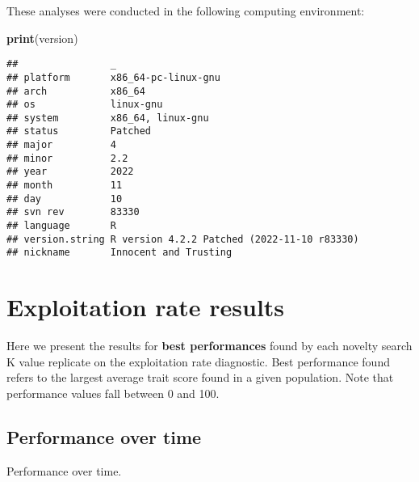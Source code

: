 \documentclass[]{book}
\newenvironment{Shaded}{\begin{snugshade}}{\end{snugshade}}
\newcommand{\KeywordTok}[1]{\textcolor[rgb]{0.13,0.29,0.53}{\textbf{#1}}}
\newcommand{\NormalTok}[1]{#1}
\begin{document}
These analyses were conducted in the following computing environment:

\begin{Shaded}
\begin{Highlighting}[]
\KeywordTok{print}\NormalTok{(version)}
\end{Highlighting}
\end{Shaded}

\begin{verbatim}
##                _                                          
## platform       x86_64-pc-linux-gnu                        
## arch           x86_64                                     
## os             linux-gnu                                  
## system         x86_64, linux-gnu                          
## status         Patched                                    
## major          4                                          
## minor          2.2                                        
## year           2022                                       
## month          11                                         
## day            10                                         
## svn rev        83330                                      
## language       R                                          
## version.string R version 4.2.2 Patched (2022-11-10 r83330)
## nickname       Innocent and Trusting
\end{verbatim}

\hypertarget{exploitation-rate-results-6}{%
\section{Exploitation rate results}\label{exploitation-rate-results-6}}

Here we present the results for \textbf{best performances} found by each novelty search K value replicate on the exploitation rate diagnostic.
Best performance found refers to the largest average trait score found in a given population.
Note that performance values fall between 0 and 100.

\hypertarget{performance-over-time-17}{%
\subsection{Performance over time}\label{performance-over-time-17}}

Performance over time.
\end{document}
